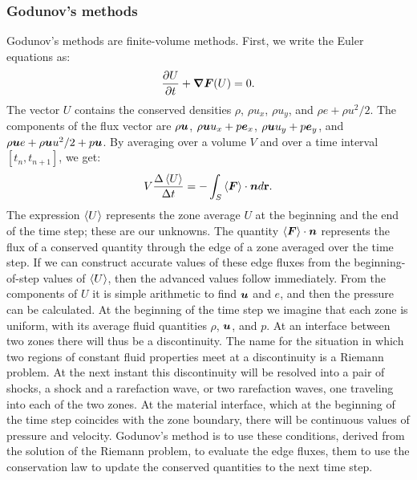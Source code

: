 \subsubsection{Godunov's methods}
Godunov's methods are finite-volume methods. First, we write the Euler
equations as:
\begin{equation}
  \frac{\partial U}{\partial t} + \boldsymbol{\nabla} \boldsymbol{F}(U)=0.
\end{equation}
The vector $U$ contains the conserved densities $\rho$, $\rho u_x$, $\rho
u_y$, and $\rho e + \rho u^2/2$. The components of the flux vector are $\rho
\boldsymbol{u}$, $\rho \boldsymbol{u}u_x+ p\boldsymbol{e}_x$, $\rho \boldsymbol{u} u_y+p\boldsymbol{e}_y$, and $\rho
\boldsymbol{u} e +\rho \boldsymbol{u} u^2/2+p\boldsymbol{u}$. By averaging over a volume $V$ and over
a time interval $[t_n,t_{n+1}]$, we get:
\begin{equation}
  V\frac{\Delta \left\langle U\right\rangle}{\Delta t} = -\int_S\left\langle \boldsymbol{F} \right\rangle \cdot \boldsymbol{n} d\mathbf{r}.
\end{equation}
The expression $\left\langle U \right\rangle$ represents the zone average $U$ at the beginning
and the end of the time step; these are our unknowns. The quantity  $\left\langle
\boldsymbol{F} \right\rangle \cdot \boldsymbol{n}$ represents the flux of a conserved quantity through
the edge of a zone averaged over the time step. If we can construct accurate
values of these edge fluxes from the beginning-of-step values of $\left\langle U \right\rangle$,
then the advanced values follow immediately. From the components of $U$ it is
simple arithmetic to find $\boldsymbol{u}$ and $e$, and then the pressure can be
calculated. At the beginning of the time step we imagine that each zone is
uniform, with its average fluid quantities $\rho$, $\boldsymbol{u}$, and $p$. At an
interface between two zones there will thus be a discontinuity. The name for
the situation in which two regions of constant fluid properties meet at a
discontinuity is a Riemann problem. At the next instant this discontinuity
will be resolved into a pair of shocks, a shock and a rarefaction wave, or two
rarefaction waves, one traveling into each of the two zones. At the material
interface, which at the beginning of the time step coincides with the zone
boundary, there will be continuous values of pressure and velocity. Godunov's
method is to use these conditions, derived from the solution of the Riemann
problem, to evaluate the edge fluxes, them to use the conservation law to
update the conserved quantities to the next time step.
